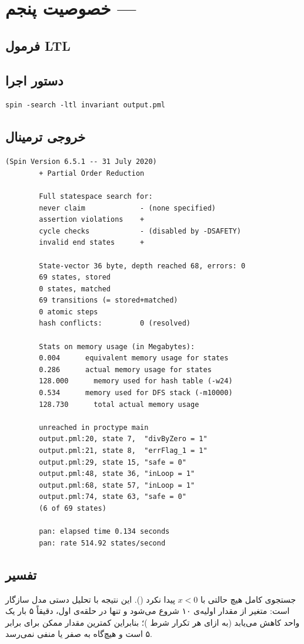 \documentclass[12pt,a4paper]{article}
\newcommand{\ltlbox}[1]{%
	\begin{center}
		\fbox{\parbox{0.9\linewidth}{\centering $#1$}}
	\end{center}
}
\begin{document}
\section{خصوصیت پنجم --- }

\subsection{فرمول LTL}
\ltlbox{\square\,(x \geq 0)}

\subsection{دستور اجرا}
\begin{latin}
	\begin{lstlisting}[style=codestyle]
		spin -search -ltl invariant output.pml
	\end{lstlisting}
\end{latin}

\subsection{خروجی ترمینال}
\begin{latin}
	\begin{lstlisting}[style=termstyle]
		(Spin Version 6.5.1 -- 31 July 2020)
		+ Partial Order Reduction
		
		Full statespace search for:
		never claim             - (none specified)
		assertion violations    +
		cycle checks            - (disabled by -DSAFETY)
		invalid end states      +
		
		State-vector 36 byte, depth reached 68, errors: 0
		69 states, stored
		0 states, matched
		69 transitions (= stored+matched)
		0 atomic steps
		hash conflicts:         0 (resolved)
		
		Stats on memory usage (in Megabytes):
		0.004      equivalent memory usage for states
		0.286      actual memory usage for states
		128.000      memory used for hash table (-w24)
		0.534      memory used for DFS stack (-m10000)
		128.730      total actual memory usage
		
		unreached in proctype main
		output.pml:20, state 7,  "divByZero = 1"
		output.pml:21, state 8,  "errFlag_1 = 1"
		output.pml:29, state 15, "safe = 0"
		output.pml:48, state 36, "inLoop = 1"
		output.pml:68, state 57, "inLoop = 1"
		output.pml:74, state 63, "safe = 0"
		(6 of 69 states)
		
		pan: elapsed time 0.134 seconds
		pan: rate 514.92 states/second
	\end{lstlisting}
\end{latin}

\subsection{تفسیر}	جستجوی کامل هیچ حالتی با $x < 0$ پیدا نکرد (). این نتیجه با تحلیل دستی مدل سازگار است: متغیر  از مقدار اولیه‌ی ۱۰ شروع می‌شود و تنها در حلقه‌ی اول، دقیقاً ۵ بار یک واحد کاهش می‌یابد (به ازای هر تکرار شرط )؛ بنابراین کمترین مقدار ممکن برای  برابر ۵ است و هیچ‌گاه به صفر یا منفی نمی‌رسد.
	
	
	
\end{document}
